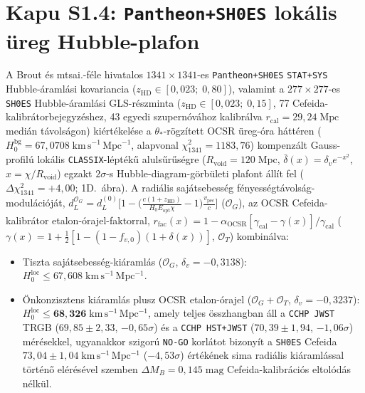 \documentclass[11pt,a4paper]{article}
\begin{document}
\section{\texorpdfstring{Kapu S1.4: \texttt{Pantheon+SH0ES} lokális üreg Hubble-plafon}{Kapu S1.4: Pantheon+SH0ES lokalis ureg Hubble-plafon}}
A Brout és mtsai.-féle hivatalos $1341\times 1341$-es \texttt{Pantheon+SH0ES} \texttt{STAT+SYS} Hubble-áramlási kovariancia ($z_{\mathrm{HD}} \in [0{,}023;\; 0{,}80]$), valamint a $277\times 277$-es \texttt{SH0ES} Hubble-áramlási GLS-részminta ($z_{\mathrm{HD}} \in [0{,}023;\; 0{,}15]$, 77 Cefeida-kalibrátorbejegyzéshez, 43 egyedi szupernóvához kalibrálva $r_{\mathrm{cal}} = 29{,}24\;\mathrm{Mpc}$ medián távolságon) kiértékelése a $\theta_*$-rögzített OCSR üreg-óra háttéren ($H_0^{\mathrm{bg}} = 67{,}0708\;\mathrm{km\,s^{-1}\,Mpc^{-1}}$, alapvonal $\chi^2_{1341} = 1183{,}76$) kompenzált Gauss-profilú lokális \texttt{CLASSIX}-léptékű alulsűrűségre ($R_{\mathrm{void}} = 120\;\mathrm{Mpc}$, $\bar{\delta}(x) = \delta_v e^{-x^2}$, $x = \chi/R_{\mathrm{void}}$) egzakt $2\sigma$-s Hubble-diagram-görbületi plafont állít fel ($\Delta\chi^2_{1341} = +4{,}00$; 1D.~ábra). A radiális sajátsebesség fényességtávolság-modulációját, $d_L^{\mathcal{O}_G} = d_L^{(0)}\bigl[1 - \bigl(\frac{c(1+z_{\mathrm{HD}})}{H_0 E_{\mathrm{opt}}\chi} - 1\bigr)\frac{v_{\mathrm{pec}}}{c}\bigr]$ ($\mathcal{O}_G$), az OCSR Cefeida-kalibrátor etalon-órajel-faktorral, $r_{\mathrm{fac}}(x) = 1 - \alpha_{\mathrm{OCSR}}[\gamma_{\mathrm{cal}} - \gamma(x)]/\gamma_{\mathrm{cal}}$ ($\gamma(x) = 1 + \frac{1}{2}[1 - (1 - f_{v,0})(1 + \delta(x))]$, $\mathcal{O}_T$) kombinálva:
\begin{itemize}
    \item Tiszta sajátsebesség-kiáramlás ($\mathcal{O}_G$, $\delta_v = -0{,}3138$): $H_0^{\mathrm{loc}} \le 67{,}608\;\mathrm{km\,s^{-1}\,Mpc^{-1}}$.
    \item Önkonzisztens kiáramlás plusz OCSR etalon-órajel ($\mathcal{O}_G + \mathcal{O}_T$, $\delta_v = -0{,}3237$): $H_0^{\mathrm{loc}} \le \mathbf{68{,}326\;\mathrm{km\,s^{-1}\,Mpc^{-1}}}$, amely teljes összhangban áll a \texttt{CCHP JWST} TRGB ($69{,}85 \pm 2{,}33$, $-0{,}65\sigma$) és a \texttt{CCHP HST+JWST} ($70{,}39 \pm 1{,}94$, $-1{,}06\sigma$) mérésekkel, ugyanakkor szigorú \texttt{NO-GO} korlátot bizonyít a \texttt{SH0ES} Cefeida $73{,}04 \pm 1{,}04\;\mathrm{km\,s^{-1}\,Mpc^{-1}}$ ($-4{,}53\sigma$) értékének sima radiális kiáramlással történő elérésével szemben $\Delta M_B = 0{,}145\;\mathrm{mag}$ Cefeida-kalibrációs eltolódás nélkül.
\end{itemize}
\end{document}
